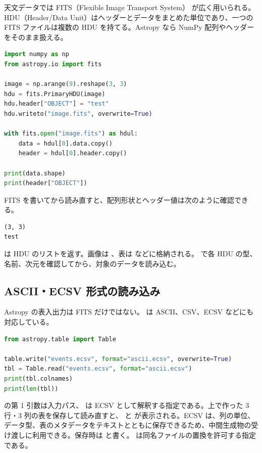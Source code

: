 天文データでは FITS（Flexible Image Transport System） が広く用いられる。HDU（Header/Data Unit）はヘッダーとデータをまとめた単位であり、一つの FITS ファイルは複数の HDU を持てる。Astropy なら NumPy 配列やヘッダーをそのまま扱える。

\begin{lstlisting}[language=Python]
import numpy as np
from astropy.io import fits

image = np.arange(9).reshape(3, 3)
hdu = fits.PrimaryHDU(image)
hdu.header["OBJECT"] = "test"
hdu.writeto("image.fits", overwrite=True)

with fits.open("image.fits") as hdul:
    data = hdul[0].data.copy()
    header = hdul[0].header.copy()

print(data.shape)
print(header["OBJECT"])
\end{lstlisting}

FITS を書いてから読み直すと、配列形状とヘッダー値は次のように確認できる。

\begin{lstlisting}[numbers=none, xleftmargin=2\zw]
(3, 3)
test
\end{lstlisting}

 は HDU のリストを返す。画像は 、表は  などに格納される。 で各 HDU の型、名前、次元を確認してから、対象のデータを読み込む。

\subsection{ASCII・ECSV 形式の読み込み}

Astropy の表入出力は FITS だけではない。 は ASCII、CSV、ECSV などにも対応している。

\begin{lstlisting}[language=Python]
from astropy.table import Table

table.write("events.ecsv", format="ascii.ecsv", overwrite=True)
tbl = Table.read("events.ecsv", format="ascii.ecsv")
print(tbl.colnames)
print(len(tbl))
\end{lstlisting}

 の第 1 引数は入力パス、 は ECSV として解釈する指定である。上で作った 3 行・3 列の表を保存して読み直すと、 と  が表示される。ECSV は、列の単位、データ型、表のメタデータをテキストとともに保存できるため、中間生成物の受け渡しに利用できる。保存時は  と書く。 は同名ファイルの置換を許可する指定である。

